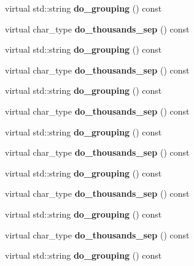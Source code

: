 \begin{DoxyCompactItemize}
virtual std\+::string {\bfseries do\+\_\+grouping} () const
\item 
\mbox{\label{classmy__numpunct_ae8e4a2f264795c77596cf270d7447d92}} 
virtual char\+\_\+type {\bfseries do\+\_\+thousands\+\_\+sep} () const
\item 
\mbox{\label{classmy__numpunct_ae6a03737ec958404f7f11693d772d1ee}} 
virtual std\+::string {\bfseries do\+\_\+grouping} () const
\item 
\mbox{\label{classmy__numpunct_ae8e4a2f264795c77596cf270d7447d92}} 
virtual char\+\_\+type {\bfseries do\+\_\+thousands\+\_\+sep} () const
\item 
\mbox{\label{classmy__numpunct_ae6a03737ec958404f7f11693d772d1ee}} 
virtual std\+::string {\bfseries do\+\_\+grouping} () const
\item 
\mbox{\label{classmy__numpunct_ae8e4a2f264795c77596cf270d7447d92}} 
virtual char\+\_\+type {\bfseries do\+\_\+thousands\+\_\+sep} () const
\item 
\mbox{\label{classmy__numpunct_ae6a03737ec958404f7f11693d772d1ee}} 
virtual std\+::string {\bfseries do\+\_\+grouping} () const
\item 
\mbox{\label{classmy__numpunct_ae8e4a2f264795c77596cf270d7447d92}} 
virtual char\+\_\+type {\bfseries do\+\_\+thousands\+\_\+sep} () const
\item 
\mbox{\label{classmy__numpunct_ae6a03737ec958404f7f11693d772d1ee}} 
virtual std\+::string {\bfseries do\+\_\+grouping} () const
\item 
\mbox{\label{classmy__numpunct_ae8e4a2f264795c77596cf270d7447d92}} 
virtual char\+\_\+type {\bfseries do\+\_\+thousands\+\_\+sep} () const
\item 
\mbox{\label{classmy__numpunct_ae6a03737ec958404f7f11693d772d1ee}} 
virtual std\+::string {\bfseries do\+\_\+grouping} () const
\item 
\mbox{\label{classmy__numpunct_ae8e4a2f264795c77596cf270d7447d92}} 
virtual char\+\_\+type {\bfseries do\+\_\+thousands\+\_\+sep} () const
\item 
\mbox{\label{classmy__numpunct_ae6a03737ec958404f7f11693d772d1ee}} 
virtual std\+::string {\bfseries do\+\_\+grouping} () const
\end{DoxyCompactItemize}


